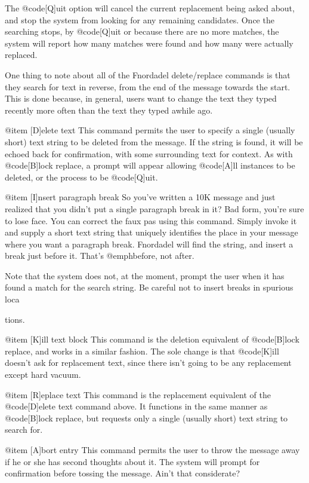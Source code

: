 The @code{[Q]uit} option will cancel the current replacement
being asked about, and stop the system from looking for
any remaining candidates.  Once the searching stops, by
@code{[Q]uit} or because there are no more matches, the system
will report how many matches were found and how many were
actually replaced.

One thing to note about all of the Fnordadel
delete/replace commands is that they search for text in
reverse, from the end of the message towards the start.
This is done because, in general, users want to change the
text they typed recently more often than the text they
typed awhile ago.

@item [D]elete text
This command permits the user to specify a single
(usually short) text string to be deleted from the message.
If the string is found, it will be echoed back for
confirmation, with some surrounding text for context.  As
with @code{[B]lock replace}, a prompt will appear allowing @code{[A]ll}
instances to be deleted, or the process to be @code{[Q]uit}.

@item [I]nsert paragraph break
So you've written a 10K message and just realized
that you didn't put a single paragraph break in it?  Bad
form, you're sure to lose face.  You can correct the faux pas
using this
command.  Simply invoke it and supply a short text string
that uniquely identifies the place in your message where
you want a paragraph break.  Fnordadel will find the
string, and insert a break just before it.  That's @emph{before},
not after.

Note that the system does not, at the moment,
prompt the user when it has found a match for the search
string.  Be careful not to insert breaks in spurious
loca

tions.

@item [K]ill text block
This command is the deletion equivalent of
@code{[B]lock replace}, and works in a similar fashion.  The sole change is
that @code{[K]ill} doesn't ask for replacement text, since there
isn't going to be any replacement except hard vacuum.

@item [R]eplace text
This command is the replacement equivalent of the
@code{[D]elete} text command above.  It functions in the same manner
as @code{[B]lock replace}, but requests only a single (usually
short) text string to search for.

@item [A]bort entry
This command permits the user to throw the message
away if he or she has second thoughts about it.  The system
will prompt for confirmation before tossing the message.  Ain't
that considerate?

